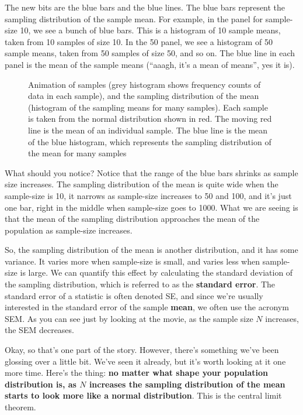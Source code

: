 \documentclass[
]{book}
\makeatletter
\newcommand*\pandocbounded[1]{%
  \sbox\pandoc@box{#1}%
  \Gscale@div\@tempa{\textheight}{\dimexpr\ht\pandoc@box+\dp\pandoc@box\relax}%
  \Gscale@div\@tempb{\linewidth}{\wd\pandoc@box}%
  \ifdim\@tempb\p@<\@tempa\p@\let\@tempa\@tempb\fi%
  \ifdim\@tempa\p@<\p@\scalebox{\@tempa}{\usebox\pandoc@box}%
  \else\usebox{\pandoc@box}%
  \fi%
}
\makeatother
\begin{document}
The new bits are the blue bars and the blue lines. The blue bars represent the sampling distribution of the sample mean. For example, in the panel for sample-size 10, we see a bunch of blue bars. This is a histogram of 10 sample means, taken from 10 samples of size 10. In the 50 panel, we see a histogram of 50 sample means, taken from 50 samples of size 50, and so on. The blue line in each panel is the mean of the sample means (``aaagh, it's a mean of means'', yes it is).

\begin{figure}
\centering
\pandocbounded{\texttt{[image: gifs/sampleDistNormal-1.gif]}}
\caption{\label{fig:4samplingmean}Animation of samples (grey histogram shows frequency counts of data in each sample), and the sampling distribution of the mean (histogram of the sampling means for many samples). Each sample is taken from the normal distribution shown in red. The moving red line is the mean of an individual sample. The blue line is the mean of the blue histogram, which represents the sampling distribution of the mean for many samples}
\end{figure}

What should you notice? Notice that the range of the blue bars shrinks as sample size increases. The sampling distribution of the mean is quite wide when the sample-size is 10, it narrows as sample-size increases to 50 and 100, and it's just one bar, right in the middle when sample-size goes to 1000. What we are seeing is that the mean of the sampling distribution approaches the mean of the population as sample-size increases.

So, the sampling distribution of the mean is another distribution, and it has some variance. It varies more when sample-size is small, and varies less when sample-size is large. We can quantify this effect by calculating the standard deviation of the sampling distribution, which is referred to as the \textbf{standard error}. The standard error of a statistic is often denoted SE, and since we're usually interested in the standard error of the sample \textbf{mean}, we often use the acronym SEM. As you can see just by looking at the movie, as the sample size \(N\) increases, the SEM decreases.

Okay, so that's one part of the story. However, there's something we've been glossing over a little bit. We've seen it already, but it's worth looking at it one more time. Here's the thing: \textbf{no matter what shape your population distribution is, as \(N\) increases the sampling distribution of the mean starts to look more like a normal distribution}. This is the central limit theorem.
\end{document}
